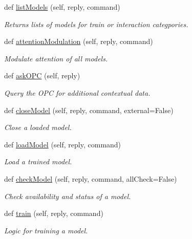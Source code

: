 \begin{DoxyCompactItemize}
def \hyperlink{group__icubclient__SAM__Core_a15253ce07b1aa30157007ba6048476b2}{list\+Models} (self, reply, command)
\begin{DoxyCompactList}\small\item\em Returns lists of models for train or interaction categpories. \end{DoxyCompactList}\item 
def \hyperlink{group__icubclient__SAM__Core_ac1aec51c6d16e7a54ae777aac6ca4293}{attention\+Modulation} (self, reply, command)
\begin{DoxyCompactList}\small\item\em Modulate attention of all models. \end{DoxyCompactList}\item 
def \hyperlink{group__icubclient__SAM__Core_a1d60fc35cdd1c4bc9127dbf2958ebe1c}{ask\+O\+PC} (self, reply)
\begin{DoxyCompactList}\small\item\em Query the O\+PC for additional contextual data. \end{DoxyCompactList}\item 
def \hyperlink{group__icubclient__SAM__Core_a17efaa79a4e949060384eb4022e6205a}{close\+Model} (self, reply, command, external=False)
\begin{DoxyCompactList}\small\item\em Close a loaded model. \end{DoxyCompactList}\item 
def \hyperlink{group__icubclient__SAM__Core_a1f0530b19957492cfd68befff45b5721}{load\+Model} (self, reply, command)
\begin{DoxyCompactList}\small\item\em Load a trained model. \end{DoxyCompactList}\item 
def \hyperlink{group__icubclient__SAM__Core_a01bb32119da2f5ab62243e538417ec73}{check\+Model} (self, reply, command, all\+Check=False)
\begin{DoxyCompactList}\small\item\em Check availability and status of a model. \end{DoxyCompactList}\item 
def \hyperlink{group__icubclient__SAM__Core_ae075c7cfe2fd460b85dd278373fd8edb}{train} (self, reply, command)
\begin{DoxyCompactList}\small\item\em Logic for training a model. \end{DoxyCompactList}\item 

\end{DoxyCompactItemize}
